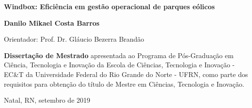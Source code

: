 \begin{titlepage}
\begin{center}
\vfill

\LARGE

\textbf{Windbox: Eficiência em gestão operacional de parques eólicos}

\vfill

\Large

\textbf{Danilo Mikael Costa Barros}

\vfill

\normalsize

Orientador: Prof. Dr. Gláucio Bezerra Brandão

\vfill

\hfill
\parbox{0.5\linewidth}{\textbf{%
Dissertação de Mestrado}
apresentada ao Programa de Pós-Graduação em Ciência, Tecnologia e Inovação da Escola de Ciências, Tecnologia e Inovação - EC\&T da Universidade Federal do Rio Grande do Norte - UFRN,
como parte dos requisitos para obtenção do título de Mestre em Ciências, Tecnologia e Inovação.}

\vfill

\large


Natal, RN, setembro de 2019

\end{center}

\end{titlepage}
